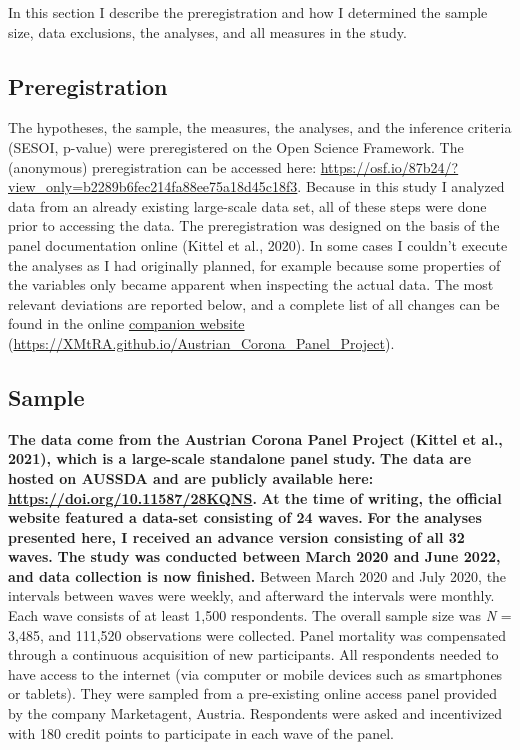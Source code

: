 \documentclass[
  man,mask]{apa7}
\begin{document}
In this section I describe the preregistration and how I determined the sample size, data exclusions, the analyses, and all measures in the study.

\hypertarget{preregistration}{%
\subsection{Preregistration}\label{preregistration}}

The hypotheses, the sample, the measures, the analyses, and the inference criteria (SESOI, p-value) were preregistered on the Open Science Framework.
The (anonymous) preregistration can be accessed here: \url{https://osf.io/87b24/?view_only=b2289b6fec214fa88ee75a18d45c18f3}.
Because in this study I analyzed data from an already existing large-scale data set, all of these steps were done prior to accessing the data.
The preregistration was designed on the basis of the panel documentation online (Kittel et al., 2020).
In some cases I couldn't execute the analyses as I had originally planned, for example because some properties of the variables only became apparent when inspecting the actual data.
The most relevant deviations are reported below, and a complete list of all changes can be found in the online \href{https://XMtRA.github.io/Austrian_Corona_Panel_Project}{companion website} (\url{https://XMtRA.github.io/Austrian_Corona_Panel_Project}).

\hypertarget{sample}{%
\subsection{Sample}\label{sample}}

\textbf{The data come from the Austrian Corona Panel Project (Kittel et al., 2021), which is a large-scale standalone panel study. }
\textbf{The data are hosted on AUSSDA and are publicly available here: \url{https://doi.org/10.11587/28KQNS}.}
\textbf{At the time of writing, the official website featured a data-set consisting of 24 waves.}
\textbf{For the analyses presented here, I received an advance version consisting of all 32 waves.}
\textbf{The study was conducted between March 2020 and June 2022, and data collection is now finished.}
Between March 2020 and July 2020, the intervals between waves were weekly, and afterward the intervals were monthly.
Each wave consists of at least 1,500 respondents.
The overall sample size was \emph{N} = 3,485, and 111,520 observations were collected.
Panel mortality was compensated through a continuous acquisition of new participants.
All respondents needed to have access to the internet (via computer or mobile devices such as smartphones or tablets).
They were sampled from a pre-existing online access panel provided by the company Marketagent, Austria.
Respondents were asked and incentivized with 180 credit points to participate in each wave of the panel.
\end{document}
